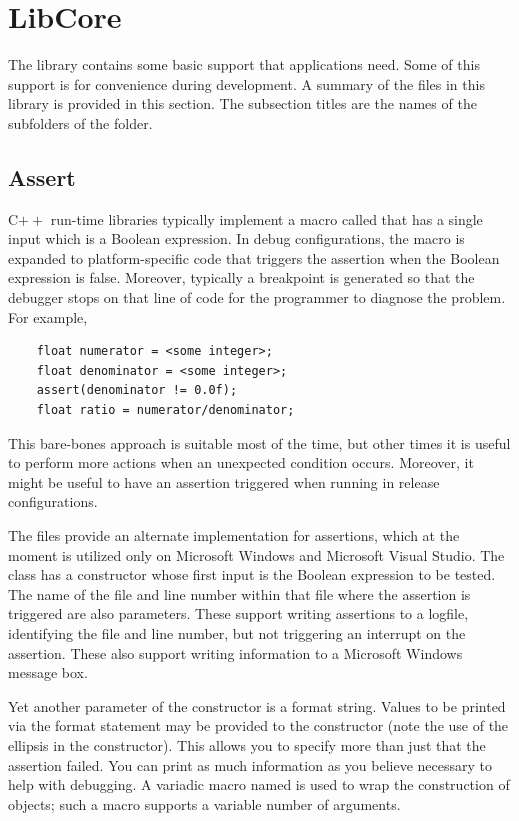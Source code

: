 \documentclass{article}
\begin{document}
\section{LibCore}

The  library contains some basic support that applications need.
Some of this support is for convenience during development.  A summary of
the files in this library is provided in this section.  The subsection titles
are the names of the subfolders of the  folder.

\subsection{Assert}

C$++$ run-time libraries typically implement a macro called 
that has a single input which is a Boolean expression.  In debug
configurations, the macro is expanded to platform-specific code that triggers
the assertion when the Boolean expression is false.  Moreover, typically
a breakpoint is generated so that the debugger stops on that line of code
for the programmer to diagnose the problem.  For example,
\begin{verbatim}
    float numerator = <some integer>;
    float denominator = <some integer>;
    assert(denominator != 0.0f);
    float ratio = numerator/denominator;
\end{verbatim}
This bare-bones approach is suitable most of the time, but other times it
is useful to perform more actions when an unexpected condition occurs.
Moreover, it might be useful to have an assertion triggered when running
in release configurations.

The files  provide an alternate implementation for
assertions, which at the moment is utilized only on Microsoft Windows
and Microsoft Visual Studio.  The class  has a constructor whose
first input is the Boolean expression to be tested.  The name of the file and
line number within that file where the assertion is triggered are also
parameters.  These support writing assertions to a logfile, identifying
the file and line number, but not triggering an interrupt on the assertion.
These also support writing information to a Microsoft Windows message box.

Yet another parameter of the constructor is a format string.  Values to be
printed via the format statement may be provided to the constructor (note
the use of the ellipsis in the constructor).  This allows you to specify
more than just that the assertion failed.  You can print as much information
as you believe necessary to help with debugging.  A variadic macro named
 is used to wrap the construction of  objects;
such a macro supports a variable number of arguments.
\end{document}
